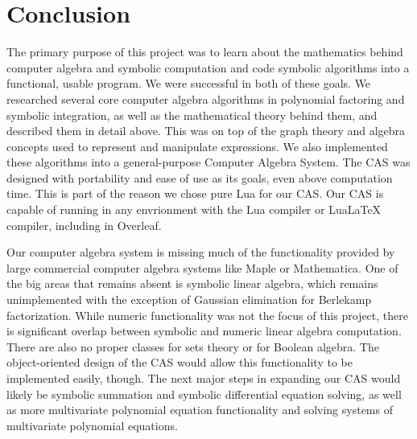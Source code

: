 \documentclass{article}
\theoremstyle{definition}
\begin{document}
\newpage

\section{Conclusion}

The primary purpose of this project was to learn about the mathematics behind computer algebra and symbolic computation and code symbolic algorithms into a functional, usable program. We were successful in both of these goals. We researched several core computer algebra algorithms in polynomial factoring and symbolic integration, as well as the mathematical theory behind them, and described them in detail above. This was on top of the graph theory and algebra concepts used to represent and manipulate expressions. We also implemented these algorithms into a general-purpose Computer Algebra System. The CAS was designed with portability and ease of use as its goals, even above computation time. This is part of the reason we chose pure Lua for our CAS. Our CAS is capable of running in any envrionment with the Lua compiler or Lua\LaTeX{} compiler, including in Overleaf. 

Our computer algebra system is missing much of the functionality provided by large commercial computer algebra systems like Maple or Mathematica. One of the big areas that remains absent is symbolic linear algebra, which remains unimplemented with the exception of Gaussian elimination for Berlekamp factorization. While numeric functionality was not the focus of this project, there is significant overlap between symbolic and numeric linear algebra computation. There are also no proper classes for sets theory or for Boolean algebra. The object-oriented design of the CAS would allow this functionality to be implemented easily, though. The next major steps in expanding our CAS would likely be symbolic summation and symbolic differential equation solving, as well as more multivariate polynomial equation functionality and solving systems of multivariate polynomial equations.

\newpage

\printbibliography
\end{document}

